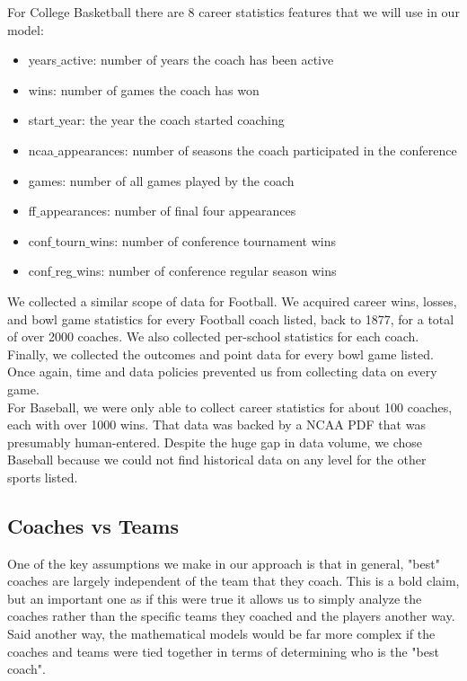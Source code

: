\documentclass[11pt,notitlepage]{article}
\begin{document}
\noindent For College Basketball there are 8 career statistics features that we will use in our model:
\begin{itemize}
\item years$\_$active: number of years the coach has been active
\item wins: number of games the coach has won
\item start$\_$year: the year the coach started coaching
\item ncaa$\_$appearances: number of seasons the coach participated in the conference
\item games: number of all games played by the coach
\item ff$\_$appearances: number of final four appearances
\item conf$\_$tourn$\_$wins: number of conference tournament wins
\item conf$\_$reg$\_$wins: number of conference regular season wins
\end{itemize}

\noindent We collected a similar scope of data for Football. We acquired career wins, losses, and bowl game statistics for every Football coach listed, back to 1877, for a total of over 2000 coaches. We also collected per-school statistics for each coach. Finally, we collected the outcomes and point data for every bowl game listed. Once again, time and data policies prevented us from collecting data on every game.
\\

\noindent For Baseball, we were only able to collect career statistics for about 100 coaches, each with over 1000 wins.\cite{based} That data was backed by a NCAA PDF \cite{NCAAPDF} that was presumably human-entered. Despite the huge gap in data volume, we chose Baseball because we could not find historical data on any level for the other sports listed.
\\

\subsection{Coaches vs Teams}

One of the key assumptions we make in our approach is that in general, "best" coaches are largely independent of the team that they coach. This is a bold claim, but an important one as if this were true it allows us to simply analyze the coaches rather than the specific teams they coached and the players another way. Said another way, the mathematical models would be far more complex if the coaches and teams were tied together in terms of determining who is the "best coach". 
\\
\end{document}
